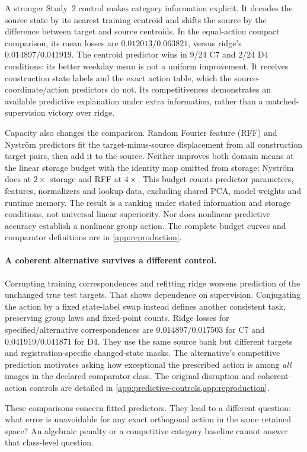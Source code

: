 A stronger Study~2 control makes category information explicit. It decodes the source state by its nearest training centroid and shifts the source by the difference between target and source centroids. In the equal-action compact comparison, its mean losses are $0.012013/0.063821$, versus ridge's $0.014897/0.041919$. The centroid predictor wins in 9/24 C7 and 2/24 D4 conditions: its better weekday mean is not a uniform improvement. It receives construction state labels and the exact action table, which the source-coordinate/action predictors do not. Its competitiveness demonstrates an available predictive explanation under extra information, rather than a matched-supervision victory over ridge.

Capacity also changes the comparison. Random Fourier feature (RFF) and Nystr\"om predictors fit the target-minus-source displacement from all construction target pairs, then add it to the source. Neither improves both domain means at the linear storage budget with the identity map omitted from storage; Nystr\"om does at $2\times$ storage and RFF at $4\times$. This budget counts predictor parameters, features, normalizers and lookup data, excluding shared PCA, model weights and runtime memory. The result is a ranking under stated information and storage conditions, not universal linear superiority. Nor does nonlinear predictive accuracy establish a nonlinear group action. The complete budget curves and comparator definitions are in \cref{app:reproduction}.

\paragraph{A coherent alternative survives a different control.}
Corrupting training correspondences and refitting ridge worsens prediction of the unchanged true test targets. That shows dependence on supervision. Conjugating the action by a fixed state-label swap instead defines another consistent task, preserving group laws and fixed-point counts. Ridge losses for specified/alternative correspondences are $0.014897/0.017503$ for C7 and $0.041919/0.041871$ for D4. They use the same source bank but different targets and registration-specific changed-state masks. The alternative's competitive prediction motivates asking how exceptional the prescribed action is among \emph{all} images in the declared comparator class. The original disruption and coherent-action controls are detailed in \cref{app:predictive-controls,app:reproduction}.

These comparisons concern fitted predictors. They lead to a different question: what error is unavoidable for any exact orthogonal action in the same retained space? An algebraic penalty or a competitive category baseline cannot answer that class-level question.

